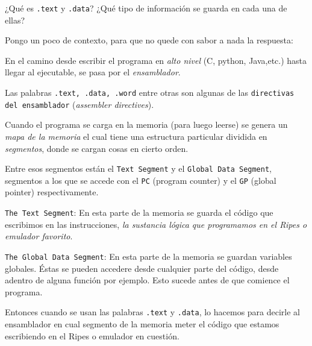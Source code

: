 \begin{enunciado}{\ejercicio}
  ¿Qué es \texttt{.text} y \texttt{.data}? ¿Qué tipo de información se guarda en cada una de ellas?
\end{enunciado}

Pongo un poco de contexto, para que no quede con sabor a nada la respuesta:

\bigskip

En el camino desde escribir el programa en \textit{alto nivel} (C, python, Java,etc.) hasta llegar al ejecutable, se pasa por el \textit{ensamblador}.

Las palabras \texttt{.text, .data, .word} entre otras son algunas de las \texttt{directivas del ensamblador} (\textit{assembler directives}).

\medskip

Cuando el programa
se carga en la memoria (para luego leerse) se genera un \textit{mapa de la memoria} el cual tiene una estructura particular dividida en \textit{segmentos},
donde se cargan cosas en cierto orden.

\medskip

Entre esos segmentos están el \texttt{Text Segment} y el \texttt{Global Data Segment}, segmentos a los que se accede con el \texttt{PC} (program counter) y el \texttt{GP} (global pointer) respectivamente.

\medskip

\texttt{The Text Segment}:
En esta parte de la memoria se guarda el código que escribimos en las instrucciones, \textit{la sustancia lógica que programamos en el Ripes o emulador favorito}.

\texttt{The Global Data Segment}:
En esta parte de la memoria se guardan variables globales. Éstas se pueden accedere desde cualquier parte
del código, desde adentro de alguna función por ejemplo. Esto sucede antes de que comience el programa.
\bigskip

Entonces cuando se usan las palabras \texttt{.text} y \texttt{.data}, lo hacemos para decirle al ensamblador en cual
segmento de la memoria meter el código que estamos escribiendo en el Ripes o emulador en cuestión.

\begin{aportes}
  \item {}
\end{aportes}
